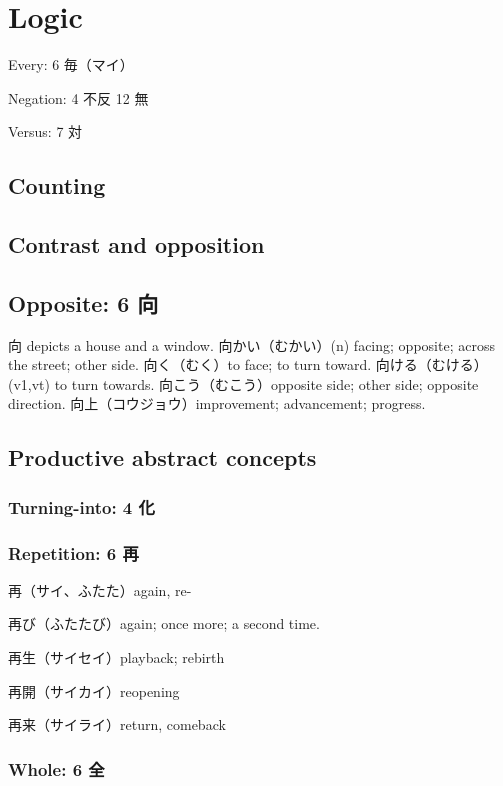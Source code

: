 \chapter{Logic}

Every: 6 毎（マイ）

Negation: 4 不反 12 無

Versus: 7 対

\section{Counting}

\section{Contrast and opposition}

\section{Opposite: 6 向}

向 depicts a house and a window.
向かい（むかい）(n) facing; opposite; across the street; other side.
向く（むく）to face; to turn toward.
向ける（むける）(v1,vt) to turn towards.
向こう（むこう）opposite side; other side; opposite direction.
向上（コウジョウ）improvement; advancement; progress.

\section{Productive abstract concepts}

\subsection{Turning-into: 4 化}

\subsection{Repetition: 6 再}

再（サイ、ふたた）again, re-

再び（ふたたび）again; once more; a second time.

再生（サイセイ）playback; rebirth

再開（サイカイ）reopening

再来（サイライ）return, comeback

\subsection{Whole: 6 全}


